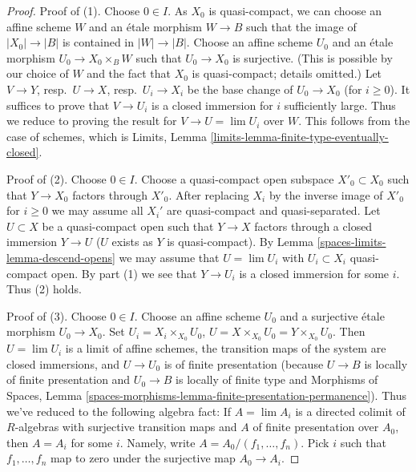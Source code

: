 \begin{proof}
Proof of (1). Choose $0 \in I$. As $X_0$ is quasi-compact, we can choose
an affine scheme $W$ and an \'etale morphism $W \to B$ such that the image of
$|X_0| \to |B|$ is contained in $|W| \to |B|$.
Choose an affine scheme $U_0$ and an \'etale morphism
$U_0 \to X_0 \times_B W$ such that $U_0 \to X_0$ is surjective.
(This is possible by our choice of $W$ and the fact that $X_0$ is
quasi-compact; details omitted.)
Let $V \to Y$, resp.\ $U \to X$, resp.\ $U_i \to X_i$ be the base change
of $U_0 \to X_0$ (for $i \geq 0$). It suffices to prove that $V \to U_i$
is a closed immersion for $i$ sufficiently large. Thus we reduce
to proving the result for $V \to U = \lim U_i$ over $W$. This follows from
the case of schemes, which is
Limits, Lemma \ref{limits-lemma-finite-type-eventually-closed}.

\medskip\noindent
Proof of (2). Choose $0 \in I$. Choose a quasi-compact open subspace
$X'_0 \subset X_0$ such that $Y \to X_0$ factors through $X'_0$.
After replacing $X_i$ by the inverse image of $X'_0$ for $i \geq 0$
we may assume all $X_i'$ are quasi-compact and quasi-separated.
Let $U \subset X$ be a quasi-compact open such that $Y \to X$ factors
through a closed immersion $Y \to U$ ($U$ exists as $Y$ is quasi-compact). By
Lemma \ref{spaces-limits-lemma-descend-opens}
we may assume that $U = \lim U_i$ with $U_i \subset X_i$ quasi-compact
open. By part (1) we see that $Y \to U_i$ is a closed immersion for some
$i$. Thus (2) holds.

\medskip\noindent
Proof of (3). Choose $0 \in I$. Choose an affine scheme $U_0$
and a surjective \'etale morphism $U_0 \to X_0$.
Set $U_i = X_i \times_{X_0} U_0$,
$U = X \times_{X_0} U_0 = Y \times_{X_0} U_0$. Then $U = \lim U_i$ is a
limit of affine schemes, the transition maps of the system are closed
immersions, and $U \to U_0$ is of finite presentation (because
$U \to B$ is locally of finite presentation and $U_0 \to B$ is locally
of finite type and
Morphisms of Spaces, Lemma
\ref{spaces-morphisms-lemma-finite-presentation-permanence}).
Thus we've reduced to the following algebra fact: If $A = \lim A_i$
is a directed colimit of $R$-algebras with surjective transition
maps and $A$ of finite presentation over $A_0$, then $A = A_i$ for
some $i$. Namely, write $A = A_0/(f_1, \ldots, f_n)$. Pick $i$ such
that $f_1, \ldots, f_n$ map to zero under the surjective map $A_0 \to A_i$.


\end{proof}
